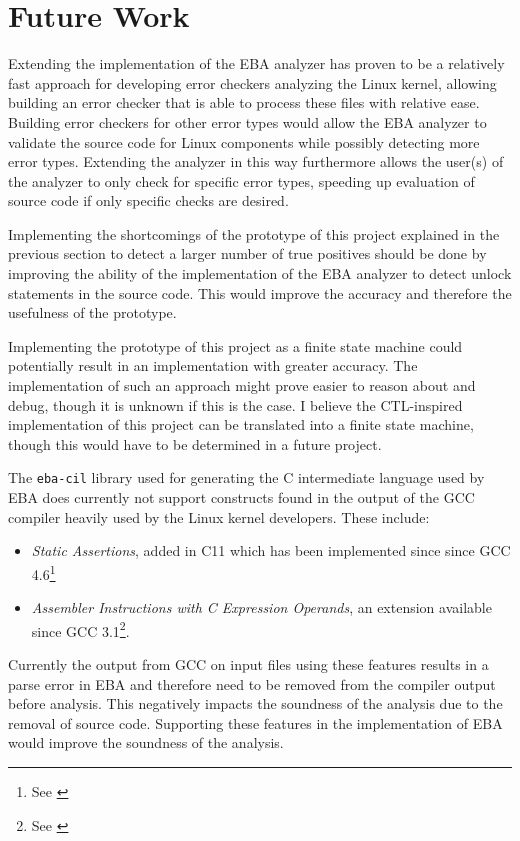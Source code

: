 \section{Future Work}

\newpar Extending the implementation of the EBA analyzer has proven to be a relatively fast approach for developing error checkers analyzing the Linux kernel, allowing building an error checker that is able to process these files with relative ease. 
Building error checkers for other error types would allow the EBA analyzer to validate the source code for Linux components while possibly detecting more error types. Extending the analyzer in this way furthermore allows the user(s) of the analyzer to only check for specific error types, speeding up evaluation of source code if only specific checks are desired. 

\newpar Implementing the shortcomings of the prototype of this project explained in the previous section to detect a larger number of true positives should be done by improving the ability of the implementation of the EBA analyzer to detect unlock statements in the source code. This would improve the accuracy and therefore the usefulness of the prototype.

\newpar Implementing the prototype of this project as a finite state machine could potentially result in an implementation with greater accuracy. The implementation of such an approach might prove easier to reason about and debug, though it is unknown if this is the case. I believe the CTL-inspired implementation of this project can be translated into a finite state machine, though this would have to be determined in a future project.

\newpar The \texttt{eba-cil} library used for generating the C intermediate language used by EBA does currently not support constructs found in the output of the GCC compiler heavily used by the Linux kernel developers. These include:
\begin{itemize}
    \item \textit{Static Assertions}, added in C11 which has been implemented since since GCC 4.6\footnote{See \cite{ISO:2011:IIIb}}
    \item \textit{Assembler Instructions with C Expression Operands}, an extension available since GCC 3.1\footnote{See \cite{GCC:3.1}}.
\end{itemize}

\noindent Currently the output from GCC on input files using these features results in a parse error in EBA and therefore need to be removed from the compiler output before analysis. This negatively impacts the soundness of the analysis due to the removal of source code. Supporting these features in the implementation of EBA would improve the soundness of the analysis.